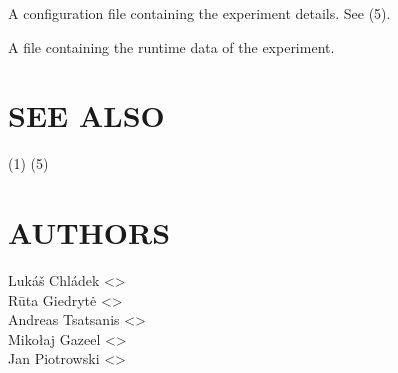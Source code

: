 \documentclass[a4paper,english]{article}
\begin{document}
        \begin{Description}[Files]\setlength{\itemsep}{0cm}
            \item[\File{gourd.toml}] A configuration file containing the experiment details. See (5).
            \item[\File{<experiment-dir>/<experiment-number>.lock}] A file containing the runtime data of the experiment.
        \end{Description}

    \section{SEE ALSO}

        (1)
        (5)

    \section{AUTHORS}
    Lukáš Chládek <>\\[0.1cm]\MANbr
    Rūta Giedrytė <>\\[0.1cm]\MANbr
    Andreas Tsatsanis <>\\[0.1cm]\MANbr
    Mikołaj Gazeel <>\\[0.1cm]\MANbr
    Jan Piotrowski <>

%

\end{document}
